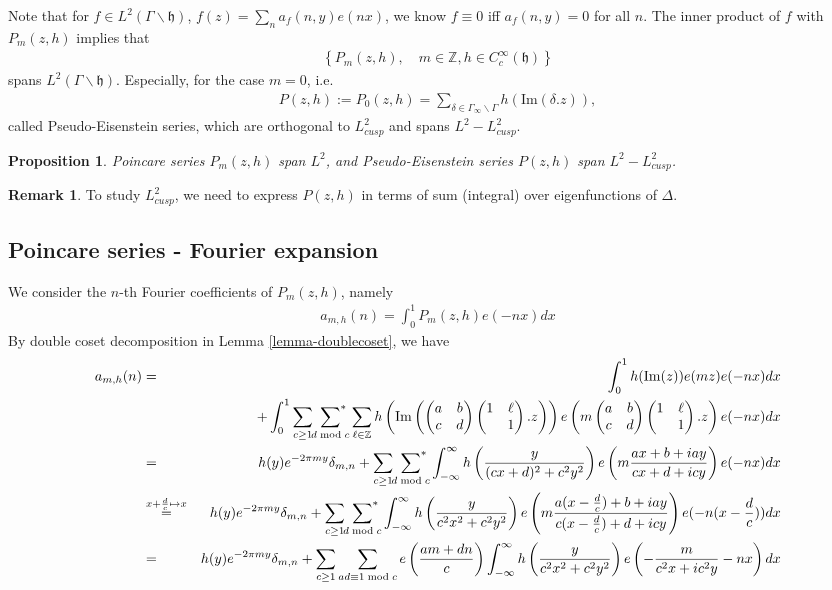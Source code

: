 \documentclass[11pt,reqno]{amsart}
\newcommand{\bna}{\begin{eqnarray*}}
\newcommand{\ena}{\end{eqnarray*}}
\newcommand{\bma}{\begin{pmatrix}}
\newcommand{\ema}{\end{pmatrix}}
\newcommand{\mk}{\mathfrak}
\def\im{{\mathrm{Im}}}
\def\Z{\mathbb{Z}}
\newtheorem{prop}[lemma]{Proposition}
\theoremstyle{definition}
\newtheorem{remark}{Remark}
\begin{document}
Note that for $f\in L^2(\Gamma\backslash\mk h)$, $f(z)=\sum_{n} a_f(n,y)e(nx)$,
we know $f\equiv 0$ iff $a_f(n,y)=0$ for all $n$.
The inner product of $f$ with $P_m(z,h)$ implies that
\bna
\left\{ P_{m}(z,h),\quad m\in \Z, h\in C_c^\infty(\mk h)\right\}
\ena
spans $L^2(\Gamma\backslash \mk h)$.
Especially, for the case $m=0$, i.e.
\bna
P(z,h):=P_0(z,h)=\sum_{\delta\in\Gamma_\infty\backslash\Gamma}h(\im(\delta.z)),
\ena
called Pseudo-Eisenstein series, which are orthogonal to $L^2_{cusp}$ and spans $L^2-L^2_{cusp}$.
\begin{prop}
Poincare series $P_m(z,h)$ span $L^2$, and Pseudo-Eisenstein series $P(z,h)$
span $L^2-L^2_{cusp}$.
\end{prop}
\begin{remark}
To study $L^2_{cusp}$, we need to express $P(z,h)$ in terms of sum (integral)
over eigenfunctions of $\Delta$.
\end{remark}

\subsection{Poincare series - Fourier expansion}
We consider the $n$-th Fourier coefficients of $P_m(z,h)$, namely
\bna
a_{m,h}(n)=\int_0^1 P_m(z,h)e(-nx)dx
\ena
By double coset decomposition in Lemma \ref{lemma-doublecoset}, we have
\bna
a_{m,h}(n)&=&\int_0^1 h(\im (z))e(m z)e(-nx)dx\\
&&+\int_0^1\sum_{c\geq 1}\sideset{}{^*}\sum_{d\bmod c}\sum_{\ell\in\Z}
h\left(\im\left(\bma a&b\\c&d\ema\bma1&\ell\\&1\ema.z\right)\right)
e\left(m\bma a&b\\c&d\ema\bma1&\ell\\&1\ema.z\right)
e(-nx)dx\\
&=&
h(y)e^{-2\pi my}\delta_{m,n}+
\sum_{c\geq 1}\sideset{}{^*}\sum_{d\bmod c}
\int_{-\infty}^\infty
h\left(\frac{y}{(cx+d)^2+c^2y^2}\right)
e\left(m\frac{ax+b+iay}{cx+d+icy}\right)
e(-nx)dx\\
&\overset{x+\frac{d}{c}\mapsto x}=&
h(y)e^{-2\pi my}\delta_{m,n}+
\sum_{c\geq 1}\sideset{}{^*}\sum_{d\bmod c}
\int_{-\infty}^\infty
h\left(\frac{y}{c^2x^2+c^2y^2}\right)
e\left(m\frac{a(x-\frac{d}{c})+b+iay}{c(x-\frac{d}{c})+d+icy}\right)
e(-n(x-\frac{d}{c}))dx\\
&=&
h(y)e^{-2\pi my}\delta_{m,n}+
\sum_{c\geq 1}\sum_{ad\equiv 1\bmod c}e\left(\frac{am+dn}{c}\right)
\int_{-\infty}^\infty
h\left(\frac{y}{c^2x^2+c^2y^2}\right)
e\left(-\frac{m}{c^2x+ic^2y}-nx\right)dx
\ena
\end{document}
